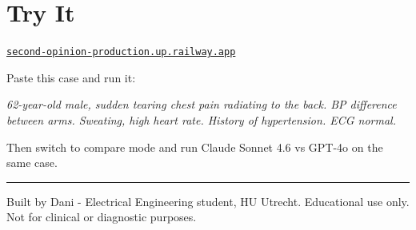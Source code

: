 \documentclass[11pt, a4paper]{article}
\begin{document}
\section{Try It}

\href{https://second-opinion-production.up.railway.app}{\texttt{second-opinion-production.up.railway.app}}

Paste this case and run it:

\begin{mdframed}[style=demobox]
\small\itshape
62-year-old male, sudden tearing chest pain radiating to the back. BP difference between arms. Sweating, high heart rate. History of hypertension. ECG normal.
\end{mdframed}

Then switch to compare mode and run Claude Sonnet 4.6 vs GPT-4o on the same case.

\vspace{14pt}
{\color{borderlight}\rule{\linewidth}{0.4pt}}
\vspace{6pt}

{\footnotesize\color{textmuted} Built by Dani - Electrical Engineering student, HU Utrecht. \hfill Educational use only. Not for clinical or diagnostic purposes.}
\end{document}
